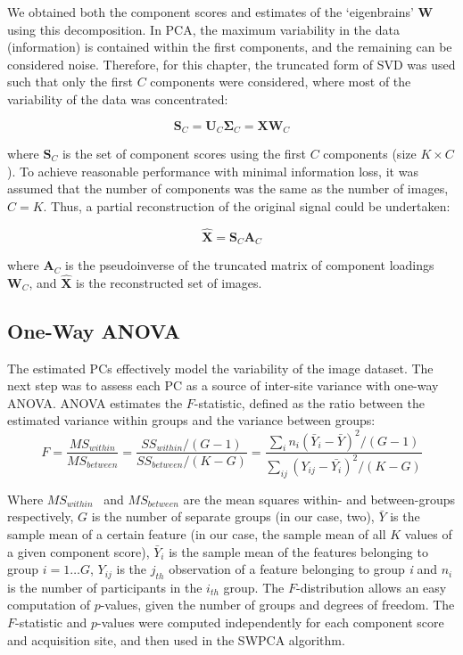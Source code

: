 We obtained both the component scores and estimates of the `eigenbrains' $\mathbf{W}$ using this decomposition. In \ac{PCA}, the maximum variability in the data (information) is contained within the first components, and the remaining can be considered noise. Therefore, for this chapter, the truncated form of \ac{SVD} was used such that only the first $C$ components were considered, where most of the variability of the data was concentrated:

\begin{equation}
	\mathbf{S}_C = \mathbf{U}_C \boldsymbol{\Sigma}_C = \mathbf{X}\mathbf{W}_C
\end{equation}

where  $\mathbf{S}_C$ is the set of component scores using the first $C$ components (size $K\times C$). To achieve reasonable performance with minimal information loss, it was assumed that the number of components was the same as the number of images, $C=K$. Thus, a partial reconstruction of the original signal could be undertaken:

\begin{equation}\label{eq:swpcareconst}
	\hat{\mathbf{X}}=\mathbf{S}_C \mathbf{A}_C
\end{equation}

where  $\mathbf{A}_C$ is the pseudoinverse of the truncated matrix of component loadings  $\mathbf{W}_C$, and  $\hat{\mathbf{X}}$ is the reconstructed set of images.


\subsection{One-Way \acf{ANOVA}}
The estimated PCs effectively model the variability of the image dataset. The next step was to assess each PC as a source of inter-site variance with one-way \acf{ANOVA}. \ac{ANOVA} estimates the $F$-statistic, defined as the ratio between the estimated variance within groups and the variance between groups:
\begin{equation}
F=\frac{M{S}_{\mathit{within}}}{M{S}_{\mathit{between}}}=\frac{S{S}_{\mathit{within}}/(G-1)}{S{S}_{\mathit{between}}/(K-G)}=\frac{\sum
	_{i}{{n}_{i}{\left({\bar{{Y}}}_{i}-\bar{{Y}}\right)}^{2}/{\left(G-1\right)}}}{\sum
	_{\mathit{ij}}{{\left({Y}_{\mathit{ij}}-\bar{{{Y}_{i}}}\right)}^{2}/{\left(K-G\right)}}}
\end{equation}

Where  $M{S}_{\mathit{within}}$ \ and  $M{S}_{\mathit{between}}$ are the mean squares within- and between-groups respectively, $G$ is the number of separate groups (in our case, two),  $\bar{Y}$ is the sample mean of a certain feature (in our case, the sample mean of all $K$ values of a given component score),  ${\bar{Y}}_{i}$ is the sample mean of the features belonging to group $i=1\dots G$, ${Y}_{\mathit{ij}}$ is the $j_{th}$ observation of a feature belonging to group \textit{i} and  ${n}_{i}$ is the number of participants in the  $i_{th}$ group. The $F$-distribution allows an easy computation of $p$-values, given the number of groups and degrees of freedom. The $F$-statistic and $p$-values were computed independently for each component score and acquisition site, and then used in the \ac{SWPCA} algorithm.

